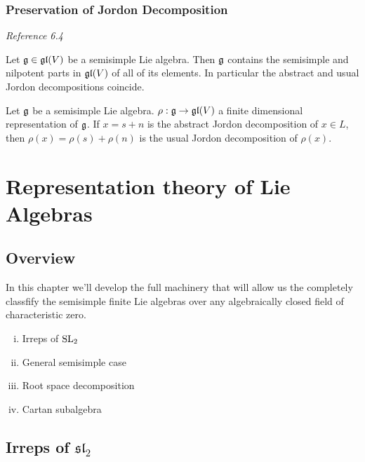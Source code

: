 \subsection{Preservation of Jordon Decomposition}
\label{sub:preservation_of_jordon_decomposition}
\emph{Reference \cite{humphreys1972introduction} 6.4}

\begin{theorem}
    \label{thm:preservation_of_jordon_decomposition}
   Let $\mathfrak{g}\in \mathfrak{gl}(V)$  be a semisimple Lie algebra. Then $\mathfrak{g}$ contains the semisimple and nilpotent parts in $\mathfrak{gl}(V)$ of all of its elements. In  particular the abstract and usual Jordon decompositions coincide.
\end{theorem}

\begin{corollary}
    \label{cor:jordon}
    Let $\mathfrak{g}$ be a semisimple Lie algebra. $\rho: \mathfrak{g}\to \mathfrak{gl}(V)$ a finite dimensional representation of $\mathfrak{g}$. If $x=s + n$ is the abstract Jordon decomposition of $x\in L$, then $\rho(x)=\rho(s) + \rho(n)$ is the usual Jordon decomposition of $\rho(x)$.
\end{corollary}


\chapter{Representation theory of Lie Algebras}
\label{cha:representation_theory_of_lie_algebras}



\section{Overview}
In this chapter we'll develop the full machinery that will allow us the completely classfify the semisimple finite Lie algebras over any algebraically closed field of characteristic zero.

\begin{enumerate}[(i)]
    \makethislistcompact
    \item Irreps of $\text{SL}_2$
    \item General semisimple case
    \item Root space decomposition
    \item Cartan subalgebra
\end{enumerate}


\section{Irreps of \texorpdfstring{$\mathfrak{sl}_2$}{sl\_2}}
\label{sec:irreps_of_sl_2}

